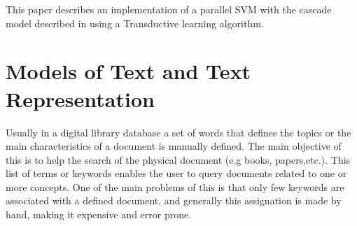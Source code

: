 
This paper describes an implementation of a parallel SVM with the
cascade model described in \cite{GrafCBDV04} using a Transductive
learning algorithm. 

%
 \section{Models of Text and Text Representation\label{sub:Models-of-Text}}
%

 Usually in a digital library database a set of words that defines
 the topics or the main characteristics of a document is manually defined.
 The main objective of this is to help the search of the physical document
 (e.g books, papers,etc.). This list of terms or keywords enables the
 user to query documents related to one or more concepts. One of the
 main problems of this is that only few keywords are associated with
 a defined document, and generally this assignation is made by hand,
 making it expensive and error prone.


